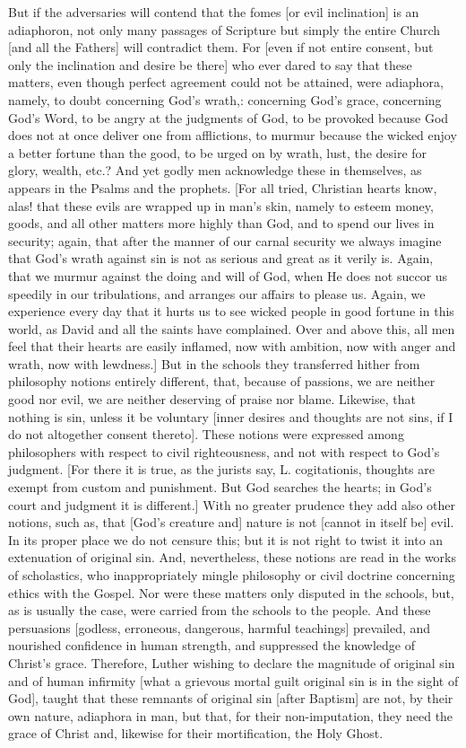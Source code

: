 But if the adversaries will contend that the fomes [or evil
inclination] is an adiaphoron, not only many passages of Scripture
but simply the entire Church [and all the Fathers] will contradict
them.  For [even if not entire consent, but only the inclination and
desire be there] who ever dared to say that these matters, even
though perfect agreement could not be attained, were adiaphora,
namely, to doubt concerning God's wrath,: concerning God's grace,
concerning God's Word, to be angry at the judgments of God, to be
provoked because God does not at once deliver one from afflictions,
to murmur because the wicked enjoy a better fortune than the good, to
be urged on by wrath, lust, the desire for glory, wealth, etc.?  And
yet godly men acknowledge these in themselves, as appears in the
Psalms and the prophets.  [For all tried, Christian hearts know, alas!
that these evils are wrapped up in man's skin, namely to esteem
money, goods, and all other matters more highly than God, and to
spend our lives in security; again, that after the manner of our
carnal security we always imagine that God's wrath against sin is not
as serious and great as it verily is.  Again, that we murmur against
the doing and will of God, when He does not succor us speedily in our
tribulations, and arranges our affairs to please us.  Again, we
experience every day that it hurts us to see wicked people in good
fortune in this world, as David and all the saints have complained.
Over and above this, all men feel that their hearts are easily
inflamed, now with ambition, now with anger and wrath, now with
lewdness.] But in the schools they transferred hither from philosophy
notions entirely different, that, because of passions, we are neither
good nor evil, we are neither deserving of praise nor blame.
Likewise, that nothing is sin, unless it be voluntary [inner desires
and thoughts are not sins, if I do not altogether consent thereto].
These notions were expressed among philosophers with respect to civil
righteousness, and not with respect to God's judgment.  [For there it
is true, as the jurists say, L. cogitationis, thoughts are exempt
from custom and punishment.  But God searches the hearts; in God's
court and judgment it is different.] With no greater prudence they
add also other notions, such as, that [God's creature and] nature is
not [cannot in itself be] evil.  In its proper place we do not
censure this; but it is not right to twist it into an extenuation of
original sin.  And, nevertheless, these notions are read in the works
of scholastics, who inappropriately mingle philosophy or civil
doctrine concerning ethics with the Gospel.  Nor were these matters
only disputed in the schools, but, as is usually the case, were
carried from the schools to the people.  And these persuasions
[godless, erroneous, dangerous, harmful teachings] prevailed, and
nourished confidence in human strength, and suppressed the knowledge
of Christ's grace.  Therefore, Luther wishing to declare the
magnitude of original sin and of human infirmity [what a grievous
mortal guilt original sin is in the sight of God], taught that these
remnants of original sin [after Baptism] are not, by their own nature,
adiaphora in man, but that, for their non-imputation, they need the
grace of Christ and, likewise for their mortification, the Holy Ghost.

